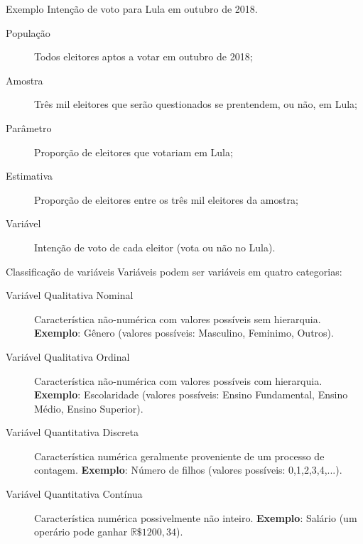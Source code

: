 \documentclass[9pt]{beamer}
\begin{document}
\begin{frame}{Exemplo}
 Intenção de voto para Lula em outubro de 2018.
 
 \begin{description}
  \item[População] Todos eleitores aptos a votar em outubro de 2018;
  \vfill
  
  \item[Amostra] Três mil eleitores que serão questionados se prentendem, ou não, em Lula;
  \vfill
  
  \item[Parâmetro] Proporção de eleitores que votariam em Lula;
  \vfill
  
  \item[Estimativa] Proporção de eleitores entre os três mil eleitores da amostra;
  \vfill
  
  \item[Variável] Intenção de voto de cada eleitor (vota ou não no Lula).
 \end{description}
\end{frame}

\begin{frame}{Classificação de variáveis}
 Variáveis podem ser variáveis em quatro categorias:
 \begin{description}
  \item[Variável Qualitativa Nominal] Característica não-numérica com valores possíveis sem hierarquia. \textbf{Exemplo}: Gênero (valores possíveis: Masculino, Feminimo, Outros).
  \vfill
  
  \item[Variável Qualitativa Ordinal] Característica não-numérica com valores possíveis com hierarquia. \textbf{Exemplo}: Escolaridade (valores possíveis: Ensino Fundamental, Ensino Médio, Ensino Superior).
  \vfill
  
  \item[Variável Quantitativa Discreta] Característica numérica geralmente proveniente de um processo de contagem. \textbf{Exemplo}: Número de filhos (valores possíveis: 0,1,2,3,4,...).
  \vfill
  
  \item[Variável Quantitativa Contínua] Característica numérica possivelmente não inteiro. \textbf{Exemplo}: Salário (um operário pode ganhar $\mathbb{R}\$1200,34$).
 \end{description}
\end{frame}
\end{document}
